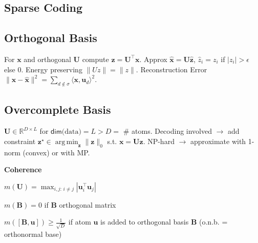 \documentclass[a4paper, 11pt, landscape]{article}
\DeclareMathOperator*{\argmin}{arg\,min}
\DeclareMathOperator*{\argmax}{arg\,max}
\begin{document}
\begin{multicols*}{3}
    \section{Sparse Coding}

    \subsection{Orthogonal Basis}
    For $\mathbf{x}$ and orthogonal $\mathbf{U}$ compute $\mathbf{z} = \mathbf{U}^\top \mathbf{x} $. Approx $ \mathbf{\hat{x}} = \mathbf{U\hat{z}}$, $\hat{z}_i = z_i$ if $ \lvert z_i \rvert > \epsilon$ else 0.
    Energy preserving $\|Uz\| = \|z\|$.
    Reconstruction Error $\|\mathbf{x}-\mathbf{\hat{x}}\|^2 = \sum_{d\notin\sigma}\langle\mathbf{x},\mathbf{u}_d\rangle ^2$.

    \subsection{Overcomplete Basis}
    $\mathbf{U} \in \mathbb{R}^{D \times  L}$ for $\mathsf{dim}\text{(data)} = L > D =$ \# atoms. Decoding involved $\rightarrow$ add constraint $\mathbf{z}^\star \in \argmin_\mathbf{z} \lVert \mathbf{z} \rVert_0$ s.t. $\mathbf{x} = \mathbf{Uz}$. NP-hard $\rightarrow$ approximate with 1-norm (convex) or with MP.

    \textbf{Coherence}
    \begin{inparaitem}[\color{red}\textbullet]
    \item $m(\mathbf{U}) = \max_{i,j:\, i \neq j} | \mathbf{u}_i^\top \mathbf{u}_j |$
    \item $m(\mathbf{B}) = 0$ if $\mathbf{B}$ orthogonal matrix
    \item $m([\mathbf{B}, \mathbf{u}]) \geq \frac{1}{\sqrt{D}}$ if atom $\mathbf{u}$ is added to orthogonal basis $\mathbf{B}$ (o.n.b. = orthonormal base)
    \end{inparaitem}



\end{multicols*}
\end{document}
